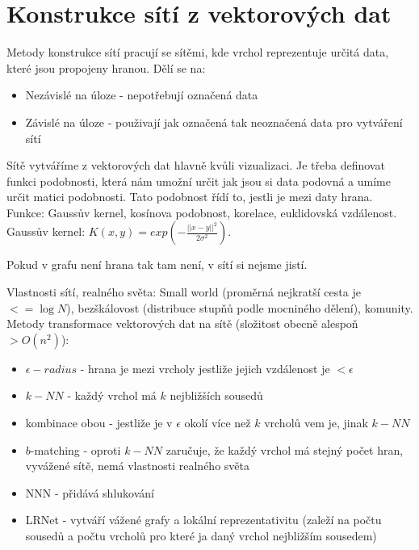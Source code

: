 \documentclass[a4paper,12pt]{article}
\begin{document}
\section{Konstrukce sítí z vektorových dat}
\label{lab:construction}
Metody konstrukce sítí pracují se sítěmi, kde vrchol reprezentuje určitá data, které jsou propojeny hranou. Dělí se na:
\begin{itemize}
    \item Nezávislé na úloze - nepotřebují označená data
    \item Závislé na úloze - použivají jak označená tak neoznačená data pro vytváření sítí
\end{itemize}
Sítě vytváříme z vektorových dat hlavně kvůli vizualizaci. Je třeba definovat funkci podobnosti, která nám umožní určit jak jsou si data podovná a umíme určit
matici podobnosti. Tato podobnost řídí to, jestli je mezi daty hrana. Funkce: Gaussův kernel, kosínova podobnost, korelace, euklidovská vzdálenost.
Gaussův kernel: $K(x,y)=exp\left(-\frac{||x-y||^2}{2\sigma ^2}\right)$.

Pokud v grafu není hrana tak tam není, v sítí si nejsme jistí.

Vlastnosti sítí, realného světa: Small world (proměrná nejkratší cesta je $ <= \log N$), bezškálovost (distribuce stupňů podle mocniného dělení), komunity.
Metody transformace vektorových dat na sítě (složitost obecně alespoň $ > O(n^2)$):
\begin{itemize}
    \item $\epsilon-radius$ - hrana je mezi vrcholy jestliže jejich vzdálenost je $< \epsilon$
    \item $k-NN$ - každý vrchol má $k$ nejbližších sousedů
    \item kombinace obou - jestliže je v $\epsilon$ okolí více než $k$ vrcholů vem je, jinak $k-NN$
    \item $b$-matching - oproti $k-NN$ zaručuje, že každý vrchol má stejný počet hran, vyvážené sítě, nemá vlastnosti realného světa
    \item NNN - přidává shlukování
    \item LRNet - vytváří vážené grafy a lokální reprezentativitu (zaleží na počtu sousedů a počtu vrcholů pro které ja daný vrchol nejbližším sousedem)
\end{itemize}
\end{document}
